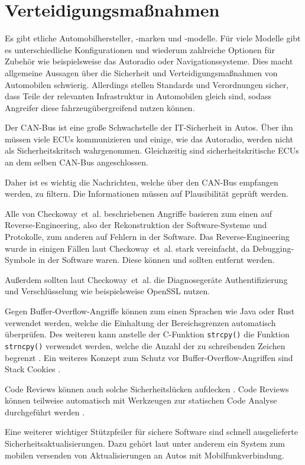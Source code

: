 \chapter{Verteidigungsmaßnahmen}\label{ch:defense}
Es gibt etliche Automobilhersteller, -marken und -modelle. Für viele Modelle
gibt es unterschiedliche Konfigurationen und wiederum zahlreiche Optionen für
Zubehör wie beispielsweise das Autoradio oder Navigationssysteme. Dies macht
allgemeine Aussagen über die Sicherheit und Verteidigungsmaßnahmen von
Automobilen schwierig. Allerdings stellen Standards und Verordnungen sicher,
dass Teile der relevanten Infrastruktur in Automobilen gleich sind, sodass
Angreifer diese fahrzeugübergreifend nutzen können.

Der CAN-Bus ist eine große Schwachstelle der IT-Sicherheit in Autos. Über ihn
müssen viele ECUs kommunizieren und einige, wie das Autoradio, werden nicht als
Sicherheitskritsch wahrgenommen. Gleichzeitig sind sicherheitskritische ECUs
an dem selben CAN-Bus angeschlossen.

Daher ist es wichtig die Nachrichten, welche über den CAN-Bus empfangen werden,
zu filtern. Die Informationen müssen auf Plausibilität geprüft werden.

Alle von Checkoway~et~al. beschriebenen Angriffe basieren zum einen auf
Reverse-Engineering, also der Rekonstruktion der Software-Systeme und
Protokolle, zum anderen auf Fehlern in der Software. Das Reverse-Engineering
wurde in einigen Fällen laut Checkoway~et~al. stark vereinfacht, da
Debugging-Symbole in der Software waren. Diese können und sollten
entfernt werden.

Außerdem sollten laut Checkoway~et~al. die Diagnosegeräte Authentifizierung und
Verschlüsselung wie beispielsweise OpenSSL nutzen.

Gegen Buffer-Overflow-Angriffe können zum einen Sprachen wie Java oder Rust
verwendet werden, welche die Einhaltung der Bereichsgrenzen automatisch
überprüfen. Des weiteren kann anstelle der C-Funktion \verb+strcpy()+ die
Funktion \verb+strncpy()+ verwendet werden, welche die Anzahl der zu
schreibenden Zeichen begrenzt \cite{Eckert2012}. Ein weiteres Konzept zum
Schutz vor Buffer-Overflow-Angriffen sind Stack Cookies \cite{Bray2002}.

Code Reviews können auch solche Sicherheitslücken aufdecken \cite{Howard2006}.
Code Reviews können teilweise automatisch mit Werkzeugen zur statischen Code
Analyse durchgeführt werden \cite{McGraw2008}.

Eine weiterer wichtiger Stützpfeiler für sichere Software sind schnell
ausgelieferte Sicherheitsaktualisierungen. Dazu gehört laut \cite{Mahaffey2015}
unter anderem ein System zum mobilen versenden von Aktualisierungen an Autos
mit Mobilfunkverbindung.